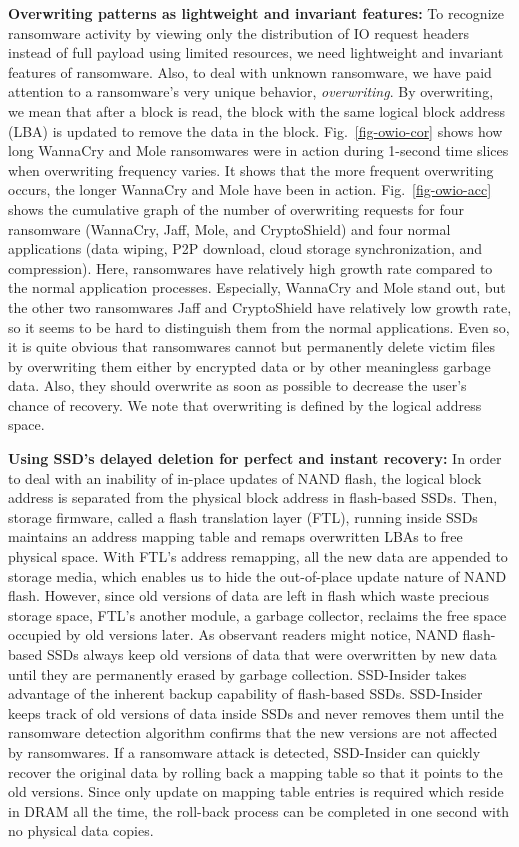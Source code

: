 \documentclass[conference]{IEEEtran}
\newcommand{\ours}{SSD-Insider}
\begin{document}
{\bf Overwriting patterns as lightweight and invariant features:}
To recognize ransomware activity by viewing only the distribution of IO request headers 
instead of full payload using limited resources, we need lightweight and invariant features of ransomware.
Also, to deal with unknown ransomware, we have paid attention to a ransomware's very unique behavior,
{\em overwriting}. By overwriting, we mean that after a block is read, the block with the same logical
block address (LBA) is updated to remove the data in the block.
Fig.~\ref{fig-owio-cor} shows how long WannaCry and Mole ransomwares were in action 
during 1-second time slices when overwriting frequency varies. It shows that the more frequent overwriting occurs, 
the longer WannaCry and Mole have been in action.
Fig.~\ref{fig-owio-acc} shows the cumulative graph of the number of overwriting requests for four ransomware 
(WannaCry, Jaff, Mole, and CryptoShield) and four normal applications (data wiping, P2P download, 
cloud storage synchronization, and compression). Here, ransomwares have relatively high growth rate compared to the normal
application processes. Especially, WannaCry and Mole stand out, but the other two ransomwares Jaff 
and CryptoShield have relatively low growth rate, so it seems to be hard to distinguish them from the normal
applications. Even so, it is quite obvious that ransomwares cannot but permanently delete victim files by 
overwriting them either by encrypted data or by other meaningless garbage data. Also, they should overwrite
as soon as possible to decrease the user's chance of recovery. We note that overwriting is defined by the logical
address space.

{\bf Using SSD's delayed deletion for perfect and instant recovery:}
In order to deal with an inability of in-place updates of NAND flash, the logical block
address is separated from the physical block address in flash-based SSDs.
Then, storage firmware, called a flash translation layer (FTL), running inside SSDs
maintains an address mapping table and remaps overwritten LBAs to free physical
space.  With FTL's address remapping, all the new data are appended to storage
media, which  enables us to hide the out-of-place update nature of NAND flash.
However, since old versions of data are left in flash which waste precious
storage space, FTL's another module, a garbage collector, reclaims the free
space occupied by old versions later.  As observant readers might notice, NAND
flash-based SSDs always keep old versions of data that were overwritten by new
data until they are permanently erased by garbage collection. \ours{} takes
advantage of the inherent backup capability of flash-based SSDs. \ours{} keeps
track of old versions of data inside SSDs and never removes them until the
ransomware detection algorithm confirms that the new versions are not affected
by ransomwares. If a ransomware attack is detected, \ours{} can quickly recover
the original data by rolling back a mapping table so that it points to the old
versions.  Since only update on mapping table entries is required which
reside in DRAM all the time, the roll-back process can be completed in one
second with no physical data copies.
\end{document}
